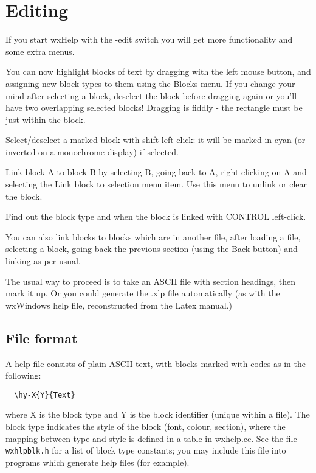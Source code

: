 \chapter{Editing}
%
\setfooter{\thepage}{}{}{}{}{\thepage}

If you start wxHelp with the -edit switch you will get more
functionality and some extra menus.

You can now highlight blocks of text by dragging with the left mouse
button, and assigning new block types to them using the Blocks menu.
If you change your mind after selecting a block, deselect the block
before dragging again or you'll have two overlapping selected blocks!
Dragging is fiddly - the rectangle must be just within the block.

Select/deselect a marked block with shift left-click: it will be
marked in cyan (or inverted on a monochrome display) if selected.

Link block A to block B by selecting B, going back to A, right-clicking
on A and selecting the Link block to selection menu item. Use
this menu to unlink or clear the block.

Find out the block type and when the block is linked with CONTROL
left-click.

You can also link blocks to blocks which are in another file, after
loading a file, selecting a block, going back the previous section
(using the Back button) and linking as per usual.

The usual way to proceed is to take an ASCII file with section
headings, then mark it up.  Or you could generate the .xlp file
automatically (as with the wxWindows help file, reconstructed from the
Latex manual.)

\section{File format}

A help file consists of plain ASCII text, with blocks marked with
codes as in the following:

\begin{verbatim}
  \hy-X{Y}{Text}
\end{verbatim}

where X is the block type and Y is the block identifier (unique within
a file).  The block type indicates the style of the block (font,
colour, section), where the mapping between type and style is defined
in a table in wxhelp.cc.  See the file {\tt wxhlpblk.h} for a list
of block type constants; you may include this file into programs which
generate help files (for example).

